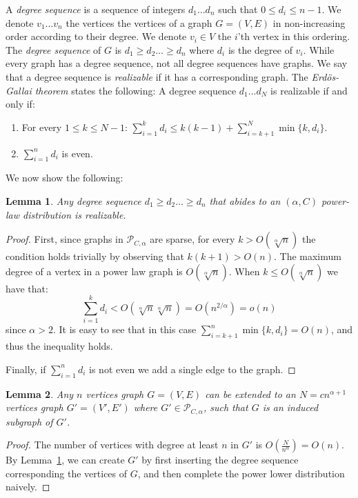 \documentclass{article}
\newtheorem{lemma}{Lemma}
\theoremstyle{remark}
\begin{document}
A \emph{degree sequence} is a sequence of  integers $d_1 \dots d_n$ such that $0 \leq d_i \leq n-1$.
We denote $v_1 \dots v_n$ the vertices the vertices of a graph $G=(V,E)$ in non-increasing order according to their degree.
We  denote $v_i \in V$ the $i$'th vertex in this ordering.
The \emph{degree sequence} of $G$ is $d_1 \geq d_2 \dots \geq d_n$ where $d_i$ is the degree of $v_i$.
While every graph has a degree sequence, not all degree sequences have graphs.
We say that a degree sequence is \emph{realizable} if it has a corresponding graph. 
The \emph{Erd\"{o}s-Gallai theorem} \cite{erdos1960graphs} states the following:
A degree sequence $d_1 \dots d_N$ is realizable if and only if:
\begin{enumerate}
\item {For every $1 \leq k \leq N-1$:   $\sum_{i=1}^k d_i \leq k(k-1)+ \sum_{i=k+1}^N \min \{k, d_i \}.$}
\item {$\sum_{i=1}^n d_i$ is even.}
\end{enumerate}

We now show the following:
\begin{lemma}\label{power-law-is-realizable}
Any degree sequence $d_1 \geq d_2 \dots \geq d_n$   that abides to  an $(\alpha,C)$ power-law distribution  is realizable.
\end{lemma}
\begin{proof}
First, since graphs in $\mathcal{P}_{C,\alpha}$ are sparse, for every $k> O(\sqrt[\alpha] n)$ the condition holds trivially by observing that $k(k+1)> O(n)$.
The maximum degree of a vertex in a power law graph is $O(\sqrt[\alpha] n)$.
When   $k\leq O(\sqrt[\alpha] n)$ we have that:
$$\sum_{i=1}^k d_i < O(\sqrt[\alpha]n \sqrt[\alpha]n) = O(n^{2/\alpha}) = o(n)$$
since  $\alpha>2$.
It is easy to see that in this case $\sum_{i=k+1}^n \min\{k,d_i\} =O(n)$, and thus the inequality holds.

Finally, if  $\sum_{i=1}^n d_i$ is not even we add a single edge to the graph.
\end{proof}

\begin{lemma}\label{G-is-powerlaw}
Any $n$ vertices graph $G=(V,E)$ can be extended to an $N=cn^{\alpha+1}$ vertices graph $G'=(V',E')$ where $G' \in \mathcal{P}_{C,\alpha}$, such that $G$ is an induced subgraph of $G'$.
\end{lemma}
\begin{proof}
The number of vertices with degree at least $n$ in $G'$  is $O(\frac{N}{n^\alpha}) = O(n)$.
By Lemma~\ref{power-law-is-realizable}, we can create $G'$
 by first inserting the degree sequence corresponding the vertices of  $G$, and then complete the power lower distribution naively.
 
\end{proof}
\end{document}
